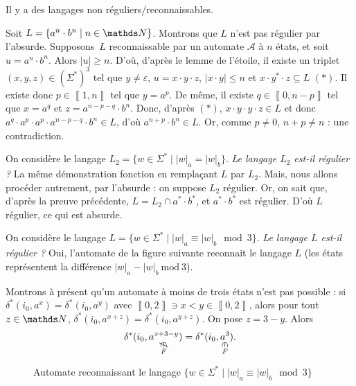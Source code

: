 \begin{crlr}
	Il y a des langages non réguliers/reconnaissables.
\end{crlr}

\begin{prv}
	Soit $L = \{a^n \cdot b^n  \mid n \in \N\}$. Montrons que $L$\/ n'est pas régulier par l'absurde. Supposons~$L$\/ reconnaissable par un automate $\mathcal{A}$\/ à $n$\/ états, et soit $u = a^n \cdot b^n$. Alors $|u| \ge n$. D'où, d'après le lemme de l'étoile, il existe un triplet $(x,y,z) \in  (\Sigma^*)^3$\/ tel que $y \neq \varepsilon$, $u = x \cdot y \cdot z$, $|x\cdot y| \le n$\/ et $x\cdot y^*\cdot z \subseteq L$ $(*)$.
	Il existe donc $p \in \left\llbracket 1,n \right\rrbracket$\/ tel que $y = a^p$. De même, il existe $q \in \left\llbracket 0,n-p \right\rrbracket$\/ tel que $x = a^q$\/ et $z = a^{n-p-q}\cdot b^n$. Donc, d'après $(*)$, $x\cdot y\cdot y\cdot z \in L$\/ et donc $a^q\cdot a^p\cdot a^p\cdot a^{n-p-q}\cdot b^n \in L$, d'où $a^{n+p} \cdot b^n \in L$. Or, comme $p \neq 0$, $n + p \neq n$\/ : une contradiction.
\end{prv}

\begin{exo}
	On considère le langage $L_2 = \{w \in \Sigma^*  \mid  |w|_a = |w|_b\}$.
	{\slshape Le langage $L_2$\/ est-il régulier ?}\/ La même démonstration fonction en remplaçant $L$\/ par $L_2$. Mais, nous allons procéder autrement, par l'absurde : on suppose $L_2$\/ régulier. Or, on sait que, d'après la preuve précédente, $L = L_2 \cap a^* \cdot b^*$, et $a^* \cdot b^*$\/ est régulier. D'où $L$\/ régulier, ce qui est absurde.
\end{exo}

\begin{exo}
	On considère le langage $L = \{w \in \Sigma^*  \mid |w|_a \equiv |w|_b\mod 3\}$.
	{\slshape Le langage $L$\/ est-il régulier ?}\/ Oui, l'automate de la figure suivante reconnait le langage $L$ (les états représentent la différence $|w|_a - |w|_b\ \mathrm{mod}\ 3$).

	Montrons à présent qu'un automate à moins de trois états n'est pas possible : si $\delta^*(i_0, a^x) = \delta^*(i_0, a^y)$\/ avec $\left\llbracket 0,2 \right\rrbracket \ni x < y \in \left\llbracket 0,2 \right\rrbracket$, alors pour tout $z \in \N$, $\delta^*(i_0, a^{x+z}) = \delta^*(i_0, a^{y+z})$. On pose $z = 3 -y$. Alors \[
		\delta^*(i_0, \underset{\substack{\vrt{\not\in}\\F}}{a^{x+3-y}}) = 
		\delta^*(i_0, \underset{\substack{\vrt{\in}\\F}}{a^{3}})
	.\] 

	\begin{figure}[H]
		\centering
		\caption{Automate reconnaissant le langage $\{w \in \Sigma^*  \mid |w|_a \equiv |w|_b \mod 3\}$}
	\end{figure}
\end{exo}

